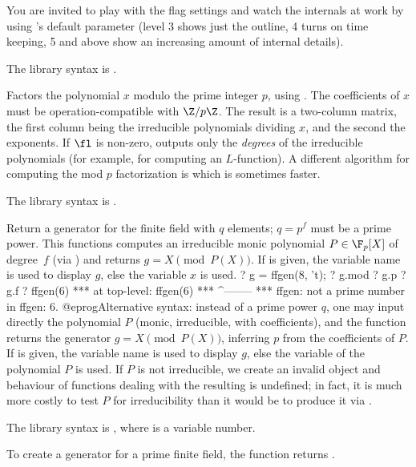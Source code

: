 You are invited to play with the flag settings and watch the internals at
work by using 's  default parameter (level 3 shows
just the outline, 4 turns on time keeping, 5 and above show an increasing
amount of internal details).

The library syntax is .

\label{se:factormod}
Factors the polynomial $x$ modulo the prime integer $p$, using
. The coefficients of $x$ must be operation-compatible with
$\Z/p\Z$. The result is a two-column matrix, the first column being the
irreducible polynomials dividing $x$, and the second the exponents. If $\fl$
is non-zero, outputs only the \emph{degrees} of the irreducible polynomials
(for example, for computing an $L$-function). A different algorithm for
computing the mod $p$ factorization is  which is sometimes
faster.

The library syntax is .

\label{se:ffgen}
Return a  generator for the finite field with $q$ elements;
$q = p^f$ must be a prime power. This functions computes an irreducible
monic polynomial $P\in\F_p[X]$ of degree~$f$ (via ) and
returns $g = X \pmod{P(X)}$. If  is given, the variable name is used
to display $g$, else the variable $x$ is used.
\bprog
? g = ffgen(8, 't);
? g.mod
? g.p
? g.f
? ffgen(6)
 ***   at top-level: ffgen(6)
 ***                 ^--------
 *** ffgen: not a prime number in ffgen: 6.
@eprog\noindent Alternative syntax: instead of a prime power $q$, one may
input directly the polynomial $P$ (monic, irreducible, with 
coefficients), and the function returns the generator $g = X \pmod{P(X)}$,
inferring $p$ from the coefficients of $P$. If  is given, the
variable name is used to display $g$, else the variable of the polynomial
$P$ is used. If $P$ is not irreducible, we create an invalid object and
behaviour of functions dealing with the resulting 
is undefined; in fact, it is much more costly to test $P$ for
irreducibility than it would be to produce it via .

The library syntax is , where  is a variable number.

To create a generator for a prime finite field, the function
 returns .

